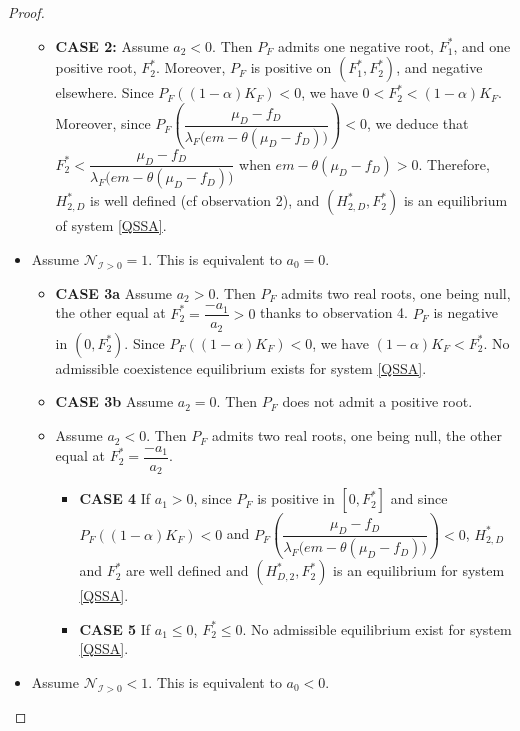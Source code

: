 \documentclass{article}
\newcommand{\lfw}{\lambda_{F}}
\newcommand{\lfw}{\lambda_{F}}
\newcommand{\cI}{\mathcal{I}}
\begin{document}
\begin{proof}
\begin{itemize}
\begin{itemize}
\item \textbf{CASE 2:} Assume $a_2<0$. Then $P_F$ admits one negative root, $F^*_1$, and one positive root, $F^*_2$. Moreover, $P_F$ is positive on $(F_1^*, F_2^*)$, and negative elsewhere. Since $P_F((1-\alpha) K_F) < 0$, we have $0 < F_2^* < (1-\alpha) K_F$. Moreover, since $P_F\left(\dfrac{\mu_D - f_D}{\lfw \Big(e m - \theta (\mu_D - f_D)\Big)} \right) < 0$, we deduce that $F_2^* < \dfrac{\mu_D - f_D}{\lfw \Big(e m - \theta (\mu_D - f_D)\Big)}$ when $e m - \theta (\mu_D - f_D) > 0$. Therefore, $H_{2,D}^*$ is well defined (cf observation 2), and $(H_{2,D}^*,F_2^*)$ is an equilibrium of system \eqref{QSSA}.

\end{itemize}

\item Assume $\mathcal{N}_{\cI > 0} = 1$. This is equivalent to $a_0 = 0$. 
\begin{itemize}
\item \textbf{CASE 3a} Assume $a_2 > 0$. Then $P_F$ admits two real roots, one being null, the other equal at $F_2^* = \dfrac{-a_1}{a_2} > 0$ thanks to observation 4. $P_F$ is negative in $(0, F_2^*)$. Since $P_F((1-\alpha)K_F) < 0$, we have $(1-\alpha)K_F < F_2^*$. No admissible coexistence equilibrium exists for system \eqref{QSSA}.
\item \textbf{CASE 3b} Assume $a_2 = 0$. Then $P_F$ does not admit a positive root.
\item  Assume $a_2 < 0$. Then $P_F$ admits two real roots, one being null, the other equal at $F_2^* = \dfrac{-a_1}{a_2}$. 
\begin{itemize}
\item \textbf{CASE 4} If $a_1 > 0$, since  $P_F$ is positive in $[0, F_2^*]$ and since $P_F((1-\alpha)K_F) < 0$ and $P_F\left(\dfrac{\mu_D - f_D}{\lfw \Big(e m - \theta (\mu_D - f_D)\Big)} \right) < 0$, $H_{2, D}^*$ and $F_2^*$ are well defined and $(H_{D, 2}^*, F_2^*)$ is an equilibrium for system \eqref{QSSA}.
\item \textbf{CASE 5} If $a_1 \leq 0$, $F_2^* \leq 0$. No admissible equilibrium exist for system \eqref{QSSA}.
\end{itemize} 
\end{itemize}


\item Assume $\mathcal{N}_{\cI > 0} < 1$. This is equivalent to $a_0<0$.


\end{itemize}
\end{proof}
\end{document}
